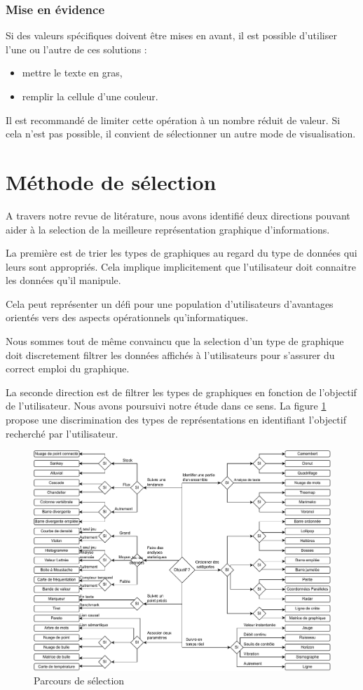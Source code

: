 \documentclass[a4paper,12pt]{article}
\begin{document}
\begin{multicols}{2}
\subsubsection{Mise en évidence}
\label{sec:orgc6a8474}
Si des valeurs spécifiques doivent être mises en avant, il est possible d'utiliser l'une ou l'autre de ces solutions :
\begin{itemize}
\item mettre le texte en gras,
\item remplir la cellule d'une couleur.
\end{itemize}
Il est recommandé de limiter cette opération à un nombre réduit de valeur. Si cela n'est pas possible, il convient de sélectionner un autre mode de visualisation.
\section{Méthode de sélection}
\label{sec:org57097c3}
A travers notre revue de litérature, nous avons identifié deux directions pouvant aider à la selection de la meilleure représentation graphique d'informations.

La première est de trier les types de graphiques au regard du type de données qui leurs sont appropriés. Cela implique implicitement que l'utilisateur doit connaitre les données qu'il manipule.

Cela peut représenter un défi pour une population d'utilisateurs d'avantages orientés vers des aspects opérationnels qu'informatiques.

Nous sommes tout de même convaincu que la selection d'un type de graphique doit discretement filtrer les données affichés à l'utilisateurs pour s'assurer du correct emploi du graphique.

La seconde direction est de filtrer les types de graphiques en fonction de l'objectif de l'utilisateur. Nous avons poursuivi notre étude dans ce sens. La figure \ref{fig:orgea9f565} propose une discrimination des types de représentations en identifiant l'objectif recherché par l'utilisateur.

\begin{figure}
\centering
\includegraphics[width=.9\linewidth]{./img/select-algorithm.pdf}
\caption{\label{fig:orgea9f565}Parcours de sélection}
\end{figure}


\end{multicols}
\end{document}
